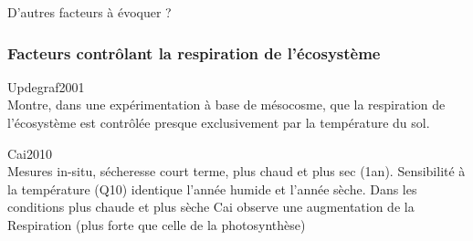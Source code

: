 

D'autres facteurs à évoquer ?


\subsubsection{Facteurs contrôlant la respiration de l'écosystème}
Updegraf2001\\
Montre, dans une expérimentation à base de mésocosme, que la respiration de l'écosystème est contrôlée presque exclusivement par la température du sol.

Cai2010\\
Mesures in-situ, sécheresse court terme, plus chaud et plus sec (1an).
Sensibilité à la température (Q10) identique l'année humide et l'année sèche.
Dans les conditions plus chaude et plus sèche Cai observe une augmentation de la Respiration (plus forte que celle de la photosynthèse)


